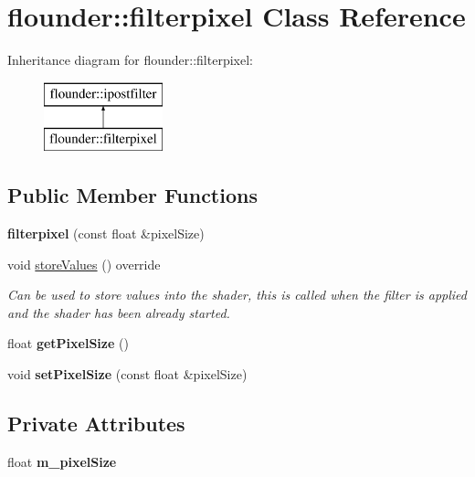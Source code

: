 \hypertarget{classflounder_1_1filterpixel}{}\section{flounder\+:\+:filterpixel Class Reference}
\label{classflounder_1_1filterpixel}
Inheritance diagram for flounder\+:\+:filterpixel\+:\begin{figure}[H]
\begin{center}
\leavevmode
\includegraphics[height=2.000000cm]{classflounder_1_1filterpixel}
\end{center}
\end{figure}
\subsection*{Public Member Functions}
\begin{DoxyCompactItemize}
\item 
\mbox{\label{classflounder_1_1filterpixel_aea7c2593620c495c641ab39031f10595}} 
{\bfseries filterpixel} (const float \&pixel\+Size)
\item 
void \hyperlink{classflounder_1_1filterpixel_abc7ae2b0a9bffd4986a664b690aab416}{store\+Values} () override
\begin{DoxyCompactList}\small\item\em Can be used to store values into the shader, this is called when the filter is applied and the shader has been already started. \end{DoxyCompactList}\item 
\mbox{\label{classflounder_1_1filterpixel_abe345d634f281e61047ec24d25569b81}} 
float {\bfseries get\+Pixel\+Size} ()
\item 
\mbox{\label{classflounder_1_1filterpixel_a196e09572387085d6685f0451cc9cb91}} 
void {\bfseries set\+Pixel\+Size} (const float \&pixel\+Size)
\end{DoxyCompactItemize}
\subsection*{Private Attributes}
\begin{DoxyCompactItemize}
\item 
\mbox{\label{classflounder_1_1filterpixel_a01b9df1d3dd3f1854ae908c8dd0f1609}} 
float {\bfseries m\+\_\+pixel\+Size}
\end{DoxyCompactItemize}
